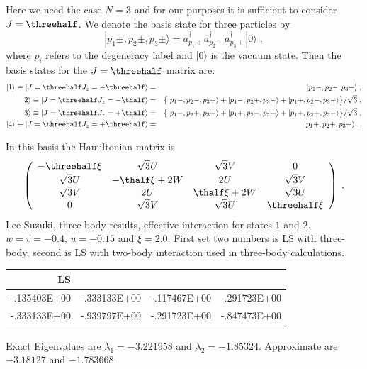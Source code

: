 Here we need the case $N=3$ and for our purposes it is sufficient
to consider $J=\threehalf$.
We denote the basis state for three particles by
\[
|p_1\pm,p_2\pm,p_3\pm\rangle=a^\dagger_{p_1\pm}a^\dagger_{p_2\pm}
a^\dagger_{p_3\pm}|0\rangle\;,
\]
where $p_i$ refers to the degeneracy label and $|0\rangle$ is the 
vacuum state. Then the basis states for the $J=\threehalf$ matrix are:
\begin{eqnarray}
|1\rangle\equiv|J=\threehalf J_z=-\threehalf\rangle
&=&|p_1-,p_2-,p_3-\rangle\;,\nonumber\\
|2\rangle\equiv|J=\threehalf J_z=-\thalf\rangle
&=&\bigl\{|p_1-,p_2-,p_3+\rangle
+|p_1-,p_2+,p_3-\rangle+|p_1+,p_2-,p_3-\rangle\bigr\}/\sqrt{3}
\;,\nonumber\\
|3\rangle\equiv|J=\threehalf J_z=+\thalf\rangle
&=&\bigl\{|p_1-,p_2+,p_3+\rangle
+|p_1+,p_2-,p_3+\rangle+|p_1+,p_2+,p_3-\rangle\bigr\}/\sqrt{3}
\;,\nonumber\\
|4\rangle\equiv|J=\threehalf J_z=+\threehalf\rangle
&=&|p_1+,p_2+,p_3+\rangle\nonumber \;.\
\end{eqnarray}

In this basis the Hamiltonian matrix is 
\[
\left(\begin{array}{cccc}
-\threehalf\xi&\sqrt{3}U&\sqrt{3}V&0\\[0.5mm]
\sqrt{3}U&-\thalf\xi+2W&2U&\sqrt{3}V\\
\sqrt{3}V&2U&\thalf\xi+2W&\sqrt{3}U\\
0&\sqrt{3}V&\sqrt{3}U&\threehalf\xi
\end{array}\right)\;. \label{mat44}
\]
Lee Suzuki, three-body results, effective interaction
for states $1$ and $2$. 
$w=v=-0.4$, $u=-0.15$ and $\xi=2.0$. 
First set two numbers is LS with three-body, second is LS
with two-body interaction used in three-body calculations.
\begin{center}
\begin{tabular}{rlrc}\\\hline
LS& & & \\ \hline
-.135403E+00 &   -.333133E+00 & -.117467E+00  &  -.291723E+00\\
-.333133E+00  &  -.939797E+00&  -.291723E+00  &  -.847473E+00  \\
& &  & \\ \hline
\end{tabular} 
\end{center} 
Exact Eigenvalues are $\lambda_1=-3.221958$  and $\lambda_2=-1.85324$. Approximate are 
$-3.18127$ and $-1.783668$.

